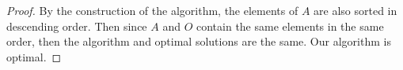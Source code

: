 \documentclass[11pt]{article}
\begin{document}
\begin{enumerate}
\begin{proof}
By the construction of the algorithm, the elements of $A$ are also sorted in descending order. Then since $A$ and $O$ contain the same elements in the same order, then the algorithm and optimal solutions are the same. Our algorithm is optimal.
%
%
\end{proof}
\end{enumerate}
\end{document}
